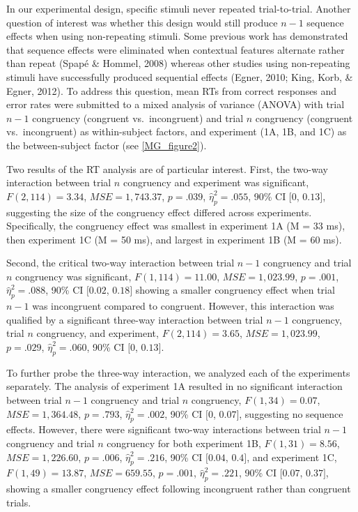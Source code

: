 \documentclass[]{DissertateCUNY}
\begin{document}
In our experimental design, specific stimuli never repeated
trial-to-trial. Another question of interest was whether this design
would still produce \(n-1\) sequence effects when using non-repeating
stimuli. Some previous work has demonstrated that sequence effects were
eliminated when contextual features alternate rather than repeat (Spapé
\& Hommel, 2008) whereas other studies using non-repeating stimuli have
successfully produced sequential effects (Egner, 2010; King, Korb, \&
Egner, 2012). To address this question, mean RTs from correct responses
and error rates were submitted to a mixed analysis of variance (ANOVA)
with trial \(n-1\) congruency (congruent vs.~incongruent) and trial
\(n\) congruency (congruent vs.~incongruent) as within-subject factors,
and experiment (1A, 1B, and 1C) as the between-subject factor (see
\ref{MG_figure2}).

Two results of the RT analysis are of particular interest. First, the
two-way interaction between trial \(n\) congruency and experiment was
significant, \(F(2, 114) = 3.34\), \(\mathit{MSE} = 1,743.37\),
\(p = .039\), \(\hat{\eta}^2_p = .055\), 90\% CI \([0\), \(0.13]\),
suggesting the size of the congruency effect differed across
experiments. Specifically, the congruency effect was smallest in
experiment 1A (M = 33 ms), then experiment 1C (M = 50 ms), and largest
in experiment 1B (M = 60 ms).

Second, the critical two-way interaction between trial \(n-1\)
congruency and trial \(n\) congruency was significant,
\(F(1, 114) = 11.00\), \(\mathit{MSE} = 1,023.99\), \(p = .001\),
\(\hat{\eta}^2_p = .088\), 90\% CI \([0.02\), \(0.18]\) showing a
smaller congruency effect when trial \(n-1\) was incongruent compared to
congruent. However, this interaction was qualified by a significant
three-way interaction between trial \(n-1\) congruency, trial \(n\)
congruency, and experiment, \(F(2, 114) = 3.65\),
\(\mathit{MSE} = 1,023.99\), \(p = .029\), \(\hat{\eta}^2_p = .060\),
90\% CI \([0\), \(0.13]\).

To further probe the three-way interaction, we analyzed each of the
experiments separately. The analysis of experiment 1A resulted in no
significant interaction between trial \(n-1\) congruency and trial \(n\)
congruency, \(F(1, 34) = 0.07\), \(\mathit{MSE} = 1,364.48\),
\(p = .793\), \(\hat{\eta}^2_p = .002\), 90\% CI \([0\), \(0.07]\),
suggesting no sequence effects. However, there were significant two-way
interactions between trial \(n-1\) congruency and trial \(n\) congruency
for both experiment 1B, \(F(1, 31) = 8.56\),
\(\mathit{MSE} = 1,226.60\), \(p = .006\), \(\hat{\eta}^2_p = .216\),
90\% CI \([0.04\), \(0.4]\), and experiment 1C, \(F(1, 49) = 13.87\),
\(\mathit{MSE} = 659.55\), \(p = .001\), \(\hat{\eta}^2_p = .221\), 90\%
CI \([0.07\), \(0.37]\), showing a smaller congruency effect following
incongruent rather than congruent trials.
\end{document}
